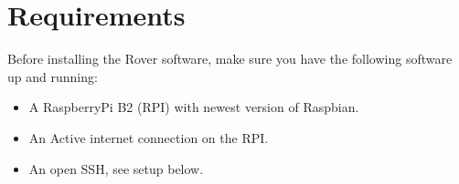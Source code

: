 \section{Requirements}
Before installing the Rover software, make sure you have the following software up and running:
\begin{itemize}
	\item A RaspberryPi B2 (RPI) with newest version of Raspbian.
	\item An Active internet connection on the RPI.
	\item An open SSH, see setup below.
\end{itemize}

